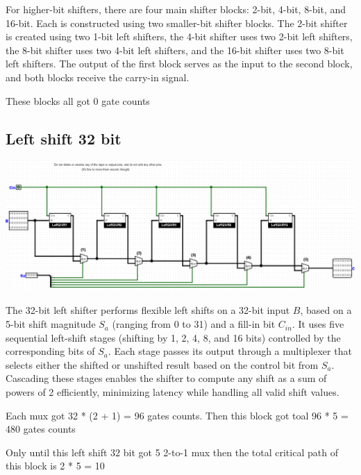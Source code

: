 \documentclass{article}
\begin{document}
\hspace*{2em}For higher-bit shifters, there are four main shifter blocks: 2-bit, 4-bit, 8-bit, and 16-bit. Each is constructed using two smaller-bit shifter blocks. The 2-bit shifter is created using two 1-bit left shifters, the 4-bit shifter uses two 2-bit left shifters, the 8-bit shifter uses two 4-bit left shifters, and the 16-bit shifter uses two 8-bit left shifters. The output of the first block serves as the input to the second block, and both blocks receive the carry-in signal.

\hspace{2em}These blocks all got 0 gate counts
\subsection{Left shift 32 bit}
\begin{center}
    \includegraphics[width=1\textwidth]{images/LeftShift32.png}
\end{center}
\hspace*{2em}The 32-bit left shifter performs flexible left shifts on a 32-bit input \( B \), based on a 5-bit shift magnitude \( S_a \) (ranging from 0 to 31) and a fill-in bit \( C_{in} \). It uses five sequential left-shift stages (shifting by 1, 2, 4, 8, and 16 bits) controlled by the corresponding bits of \( S_a \).
\hspace*{2em}Each stage passes its output through a multiplexer that selects either the shifted or unshifted result based on the control bit from \( S_a \). Cascading these stages enables the shifter to compute any shift as a sum of powers of 2 efficiently, minimizing latency while handling all valid shift values.

\hspace{2em}Each mux got 32 * (2 + 1) = 96 gates counts. Then this block got toal 96 * 5 = 480 gates counts

\hspace{2em}Only until this left shift 32 bit got 5 2-to-1 mux then the total critical path of this block is 2 * 5 = 10
\end{document}
